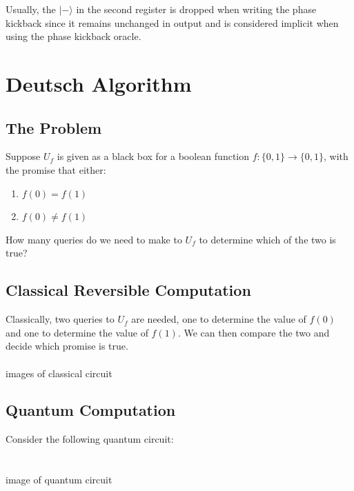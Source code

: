 \documentclass{article}
\begin{document}
    Usually, the $|-\rangle$ in the second register is dropped when writing the phase kickback since it remains unchanged in output and is considered implicit when using the phase kickback oracle.

    \section{Deutsch Algorithm}
    \subsection{The Problem}
    Suppose $U_f$ is given as a black box for a boolean function $f: \{0,1\} \rightarrow \{0,1\}$, with the promise that either:
        \begin{enumerate}[label=(\roman*)]
            \item $f(0)=f(1)$
            \item $f(0) \neq f(1)$
        \end{enumerate}
    How many queries do we need to make to $U_f$ to determine which of the two is true?  
    \subsection{Classical Reversible Computation}
    Classically, two queries to $U_f$ are needed, one to determine the value of $f(0)$ and one to determine the value of $f(1)$. We can then compare the two and decide which promise is true.
    \\\\images of classical circuit\\

    \subsection{Quantum Computation}
    Consider the following quantum circuit:\\
    \\\\image of quantum circuit\\\\\\
\end{document}
